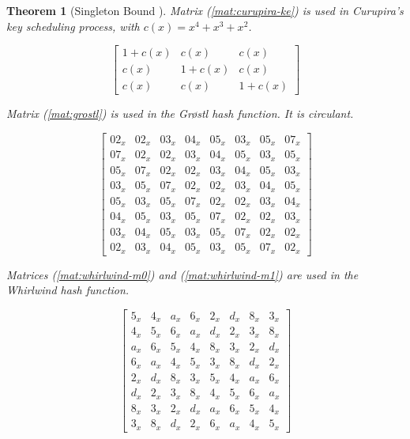 \documentclass{report}
\newtheorem{theorem}{Theorem}{\bfseries}{\itshape}
\begin{document}
\begin{theorem}[Singleton Bound \cite{SloaneBook}]
Matrix (\ref{mat:curupira-ke}) is used in Curupira's key scheduling process, with $c(x) = x^4 + x^3 + x^2$.

\begin{equation}\label{mat:curupira-ke}
\begin{bmatrix}
1+c(x) & c(x) & c(x)\\
c(x) & 1+c(x) & c(x)\\
c(x) & c(x) & 1+c(x)
\end{bmatrix}
\end{equation}

Matrix (\ref{mat:grostl}) is used in the Gr{\o}stl hash function. It is circulant.

\begin{equation}\label{mat:grostl}
\begin{bmatrix}
02_x & 02_x & 03_x & 04_x & 05_x & 03_x & 05_x & 07_x\\
07_x & 02_x & 02_x & 03_x & 04_x & 05_x & 03_x & 05_x\\
05_x & 07_x & 02_x & 02_x & 03_x & 04_x & 05_x & 03_x\\
03_x & 05_x & 07_x & 02_x & 02_x & 03_x & 04_x & 05_x\\
05_x & 03_x & 05_x & 07_x & 02_x & 02_x & 03_x & 04_x\\
04_x & 05_x & 03_x & 05_x & 07_x & 02_x & 02_x & 03_x\\
03_x & 04_x & 05_x & 03_x & 05_x & 07_x & 02_x & 02_x\\
02_x & 03_x & 04_x & 05_x & 03_x & 05_x & 07_x & 02_x
\end{bmatrix}
\end{equation}

Matrices (\ref{mat:whirlwind-m0}) and (\ref{mat:whirlwind-m1}) are used in the Whirlwind hash function.

\begin{equation}\label{mat:whirlwind-m0}
\begin{bmatrix}
5_x & 4_x & a_x & 6_x & 2_x & d_x & 8_x & 3_x\\
4_x & 5_x & 6_x & a_x & d_x & 2_x & 3_x & 8_x\\
a_x & 6_x & 5_x & 4_x & 8_x & 3_x & 2_x & d_x\\
6_x & a_x & 4_x & 5_x & 3_x & 8_x & d_x & 2_x\\
2_x & d_x & 8_x & 3_x & 5_x & 4_x & a_x & 6_x\\
d_x & 2_x & 3_x & 8_x & 4_x & 5_x & 6_x & a_x\\
8_x & 3_x & 2_x & d_x & a_x & 6_x & 5_x & 4_x\\
3_x & 8_x & d_x & 2_x & 6_x & a_x & 4_x & 5_x
\end{bmatrix}
\end{equation}


\end{theorem}
\end{document}

